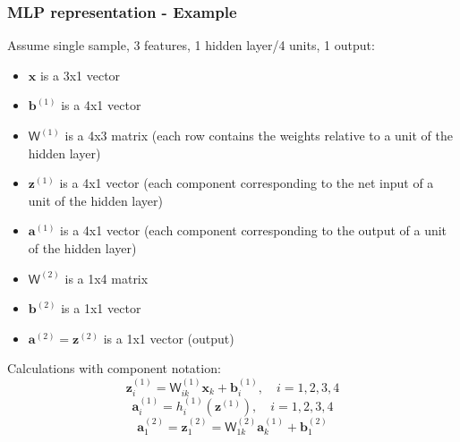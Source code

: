 \documentclass{beamer}
\begin{document}
	\begin{frame}
		\frametitle{MLP representation - Example}
		Assume single sample, 3 features, 1 hidden layer/4 units, 1 output:
		\tiny{
		\begin{itemize}
			\item $\bm{x}$ is a 3x1 vector
			\item $\bm{b}^{(1)}$ is a 4x1 vector
			\item $\mathsf{W}^{(1)}$ is a 4x3 matrix (each row contains the weights relative to a unit of the hidden layer)
			\item $\bm{z}^{(1)}$ is a 4x1 vector (each component corresponding to the net input of a unit of the hidden layer)
			\item $\bm{a}^{(1)}$ is a 4x1 vector (each component corresponding to the output of a unit of the hidden layer)
			\item $\mathsf{W}^{(2)}$ is a 1x4 matrix
			\item $\bm{b}^{(2)}$ is a 1x1 vector
			\item $\bm{a}^{(2)} = \bm{z}^{(2)}$ is a 1x1 vector (output)
		\end{itemize}}
	\normalsize
		Calculations with component notation:
		$$\bm{z}_i^{(1)} = \mathsf{W}_{ik}^{(1)}\bm{x}_k + \bm{b}^{(1)}_i, \quad i=1,2,3,4$$
		$$\bm{a}_i^{(1)} = h_i^{(1)}(\bm{z}^{(1)}), \quad i=1,2,3,4 $$
		$$\bm{a}_1^{(2)} = \bm{z}_1^{(2)} = \mathsf{W}_{1k}^{(2)}\bm{a}^{(1)}_k + \bm{b}_1^{(2)}$$
	\end{frame}
	
\end{document}

